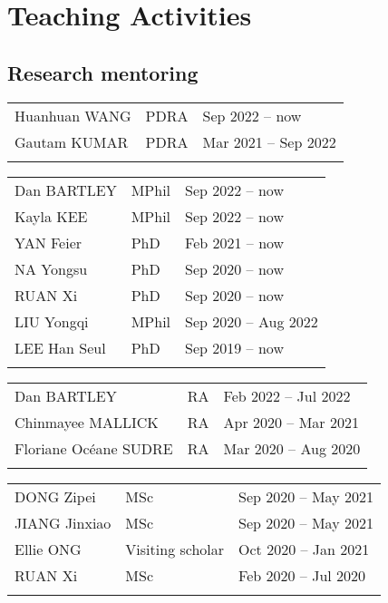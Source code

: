 \documentclass[letterpaper]{article}
\begin{document}

\section*{Teaching Activities}

\subsection*{Research mentoring}

\begin{tabularx}{\textwidth}{XXX}
  Huanhuan WANG           & PDRA  & Sep 2022 -- now\\
  Gautam KUMAR            & PDRA  & Mar 2021 -- Sep 2022\\
  \\
\end{tabularx}

\begin{tabularx}{\textwidth}{XXX}
  Dan BARTLEY             & MPhil & Sep 2022 -- now\\
  Kayla KEE               & MPhil & Sep 2022 -- now\\
  YAN Feier               & PhD   & Feb 2021 -- now\\
  NA Yongsu               & PhD   & Sep 2020 -- now\\
  RUAN Xi                 & PhD   & Sep 2020 -- now\\
  LIU Yongqi              & MPhil & Sep 2020 -- Aug 2022\\
  LEE Han Seul            & PhD   & Sep 2019 -- now\\
  \\
\end{tabularx}

\begin{tabularx}{\textwidth}{XXX}
  Dan BARTLEY             & RA    & Feb 2022 -- Jul 2022\\
  Chinmayee MALLICK       & RA    & Apr 2020 -- Mar 2021\\
  Floriane Oc\'eane SUDRE & RA    & Mar 2020 -- Aug 2020\\
  \\
\end{tabularx}

\begin{tabularx}{\textwidth}{XXX}
  DONG Zipei        & MSc               & Sep 2020 -- May 2021\\
  JIANG Jinxiao     & MSc               & Sep 2020 -- May 2021\\
  Ellie ONG         & Visiting scholar  & Oct 2020 -- Jan 2021\\
  RUAN Xi           & MSc               & Feb 2020 -- Jul 2020\\
  \\
\end{tabularx}
  
\end{document}
